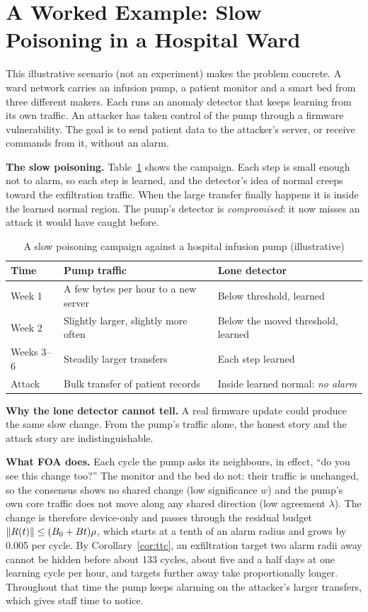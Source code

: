 \section{A Worked Example: Slow Poisoning in a Hospital Ward}\label{sec:example}

This illustrative scenario (not an experiment) makes the problem concrete. A ward network carries an
infusion pump, a patient monitor and a smart bed from three different makers. Each runs an anomaly
detector that keeps learning from its own traffic. An attacker has taken control of the pump through a
firmware vulnerability. The goal is to send patient data to the attacker's server, or receive commands
from it, without an alarm.

\textbf{The slow poisoning.} Table~\ref{tab:frog} shows the campaign. Each step is small enough not to
alarm, so each step is learned, and the detector's idea of normal creeps toward the exfiltration traffic.
When the large transfer finally happens it is inside the learned normal region. The pump's detector is
\emph{compromised}: it now misses an attack it would have caught before.

\begin{table}[t]
\caption{A slow poisoning campaign against a hospital infusion pump (illustrative)}\label{tab:frog}
\centering\footnotesize
\begin{tabular}{@{}p{1.2cm}p{3.6cm}p{3.0cm}@{}}
\toprule
Time & Pump traffic & Lone detector \\
\midrule
Week 1 & A few bytes per hour to a new server & Below threshold, learned \\
Week 2 & Slightly larger, slightly more often & Below the moved threshold, learned \\
Weeks 3--6 & Steadily larger transfers & Each step learned \\
Attack & Bulk transfer of patient records & Inside learned normal: \emph{no alarm} \\
\bottomrule
\end{tabular}
\end{table}

\textbf{Why the lone detector cannot tell.} A real firmware update could produce the same slow change.
From the pump's traffic alone, the honest story and the attack story are indistinguishable.

\textbf{What FOA does.} Each cycle the pump asks its neighbours, in effect, ``do you see this change
too?'' The monitor and the bed do not: their traffic is unchanged, so the consensus shows no shared
change (low significance $w$) and the pump's own core traffic does not move along any shared direction
(low agreement $\lambda$). The change is therefore device-only and passes through the residual budget
$\left\lVert R(t) \right\rVert\le(B_0+Bt)\rho$, which starts at a tenth of an alarm radius and grows by 0.005 per cycle.
By Corollary~\ref{cor:ttc}, an exfiltration target two alarm radii away cannot be hidden before about
133 cycles, about five and a half days at one learning cycle per hour, and targets further away take
proportionally longer. Throughout that time the pump keeps alarming on the attacker's larger transfers,
which gives staff time to notice.

